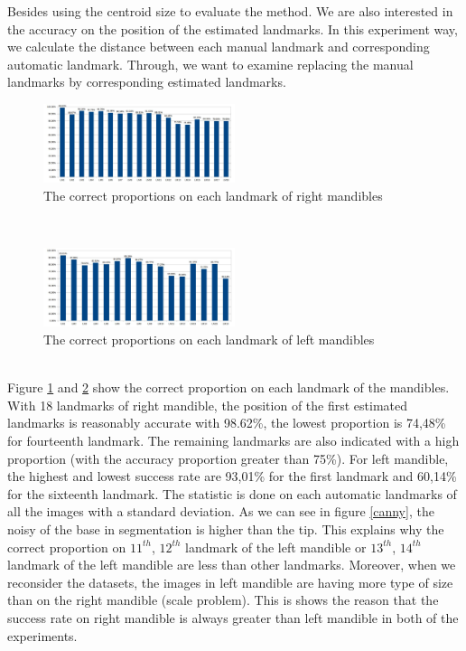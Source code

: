 \documentclass[twoside,twocolumn,10pt]{article}
\begin{document}
Besides using the centroid size to evaluate the method. We are also
interested in the accuracy on the position of the estimated landmarks. In this experiment
way, we calculate the distance between each manual landmark and
corresponding automatic landmark. Through, we want to examine replacing the manual landmarks by corresponding estimated landmarks.
\begin{figure}[htb]
    \centering
    \includegraphics[width=0.5\textwidth]{./images/md_chartlms}
    \caption{The correct proportions on each landmark of right mandibles }
    \label{figmdresultlm}
\end{figure}~\\
\begin{figure}[htb]
    \centering
    \includegraphics[width=0.5\textwidth]{./images/mg_chartlms}
    \caption{The correct proportions on each landmark of left mandibles }
    \label{figmgresultlm}
\end{figure}~\\
Figure \ref{figmdresultlm} and \ref{figmgresultlm} show the correct proportion on each landmark of the mandibles. With 18 landmarks of right mandible, the position of the first estimated landmarks is reasonably accurate with 98.62\%, the lowest proportion is 74,48\% for fourteenth landmark. The remaining landmarks are also indicated with a high proportion (with the accuracy proportion greater than 75\%). For left mandible, the highest and lowest success rate are 93,01\% for the first landmark and 60,14\% for the sixteenth landmark. The statistic is done on each automatic landmarks of all the images with a standard deviation\cite{bland1996statistics}. As we can see in figure \ref{canny}, the noisy of the base in segmentation is higher than the tip. This explains why the correct proportion on $11^{th}$, $12^{th}$ landmark of the left mandible or $13^{th}$, $14^{th}$ landmark of the left mandible are less than other landmarks. Moreover, when we reconsider the datasets, the images in left mandible are having more type of size than on the right mandible (scale problem). This is shows the reason that the success rate on right mandible is always greater than left mandible in both of the experiments.\\
\end{document}
